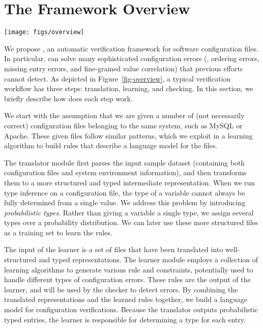 
\section{The \app Framework Overview}

\begin{figure*}[tbp] \centering
\texttt{[image: figs/overview]}
\caption{\app's workflow. The green components represent configuration 
  files, including both sample configuration datasets and users' input
  configuration files to verify. 
  The purple components are the modules of \app.
  Because template DB is not necessarily used, we use dashed
  arrow between it and the learner.
  Red boxes are sub-modules within the checker.
  The yellow components are results generated by \app's modules.}
\label{fig-overview}
\end{figure*}

We propose \app, an automatic verification framework for 
software configuration files.
In particular, \app can solve many sophisticated 
configuration errors (\eg, ordering errors, missing entry errors,
and fine-grained value correlation) that previous efforts cannot 
detect. As depicted in Figure~\ref{fig-overview}, 
a typical \app verification workflow has three steps:
translation, learning, and checking. In this section, we briefly
describe how does each step work.

We start with the assumption 
that we are given a number of (not necessarily correct) 
configuration files belonging to the same system, 
such as MySQL or Apache. 
These given files follow similar patterns, which we exploit
in a learning algorithm to build rules that
describe a language model for the files.

The translator module first parses the input sample 
dataset (containing both configuration files and system environment
information), and then transforms them to a more structured
and typed intermediate representation.
When we run type inference on a configuration file, 
the type of a variable cannot always be fully determined from 
a single value.
We address this problem 
by introducing {\em probabilistic types}.
Rather than giving a variable a single type, 
we assign several types over a probability distribution. 
We can later use these more structured files
as a training set to learn the rules. 

The input of the learner is a set of files that have been translated
into well-structured and typed representations.
The learner module employs a collection of learning algorithms
to generate various rule and constraints,
potentially used to handle different types of configuration errors.
These rules are the output of the learner, and will be 
used by the checker to detect errors.
By combining the translated representations and the learned
rules together, we build a language model for
configuration verifications.
Because the translator outputs probabilistic typed entries,
the learner is responsible for determining a type for each entry.

